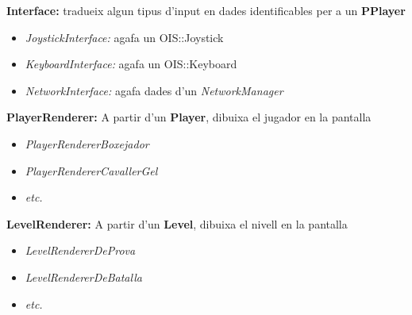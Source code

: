 \documentclass[12pt,a4paper,oneside]{article}
\begin{document}
\textbf{Interface:} tradueix algun tipus d'input en dades identificables per a un \textbf{PPlayer}
\begin{itemize}
\item\textit{JoystickInterface:} agafa un OIS::Joystick
\item\textit{KeyboardInterface:} agafa un OIS::Keyboard
\item\textit{NetworkInterface:} agafa dades d'un \textit{NetworkManager}
\end{itemize}

\textbf{PlayerRenderer:} A partir d'un \textbf{Player}, dibuixa el jugador en la pantalla
\begin{itemize}
\item\textit{PlayerRendererBoxejador}
\item\textit{PlayerRendererCavallerGel}
\item\textit{etc.}
\end{itemize}

\textbf{LevelRenderer:} A partir d'un \textbf{Level}, dibuixa el nivell en la pantalla
\begin{itemize}
\item\textit{LevelRendererDeProva}
\item\textit{LevelRendererDeBatalla}
\item\textit{etc.}
\end{itemize}
\end{document}

